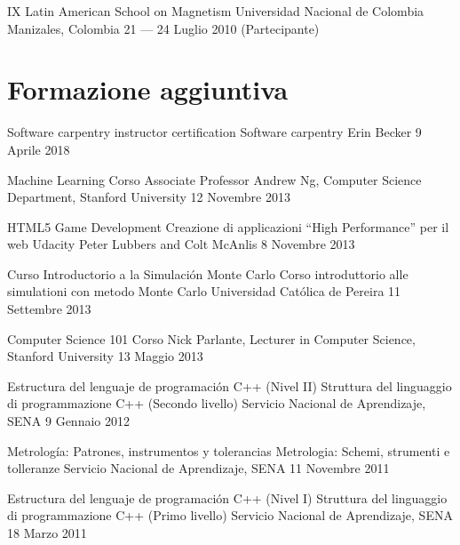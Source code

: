 \documentclass[12pt,english]{moderncv}
\begin{document}
        {IX Latin American School on Magnetism}
        {Universidad Nacional de Colombia}
        {Manizales, Colombia}
        {21 --- 24 Luglio 2010}
        {(Partecipante)}


\section{Formazione aggiuntiva}

        {Software carpentry instructor certification}
        {}
        {Software carpentry}
        {Erin Becker}
        {9 Aprile 2018}

        {Machine Learning}
        {}
        {Corso}
        {Associate Professor Andrew Ng, Computer Science Department, Stanford University}
        {12 Novembre 2013}

        {HTML5 Game Development}
        {Creazione di applicazioni ``High Performance'' per il web}
        {Udacity}
        {Peter Lubbers and Colt McAnlis}
        {8 Novembre 2013}

        {Curso Introductorio a la Simulación Monte Carlo}
        {Corso introduttorio alle simulationi con metodo Monte Carlo}
        {Universidad Católica de Pereira}
        {}
        {11 Settembre 2013}

        {Computer Science 101}
        {}
        {Corso}
        {Nick Parlante, Lecturer in Computer Science, Stanford University}
        {13 Maggio 2013}

        {Estructura del lenguaje de programación C++ (Nivel II)}
        {Struttura del linguaggio di programmazione C++ (Secondo livello)}
        {Servicio Nacional de Aprendizaje, SENA}
        {}
        {9 Gennaio 2012}

        {Metrología: Patrones, instrumentos y tolerancias}
        {Metrologia: Schemi, strumenti e tolleranze}
        {Servicio Nacional de Aprendizaje, SENA}
        {}
        {11 Novembre 2011}

        {Estructura del lenguaje de programación C++ (Nivel I)}
        {Struttura del linguaggio di programmazione C++ (Primo livello)}
        {Servicio Nacional de Aprendizaje, SENA}
        {}
        {18 Marzo 2011}
\end{document}
